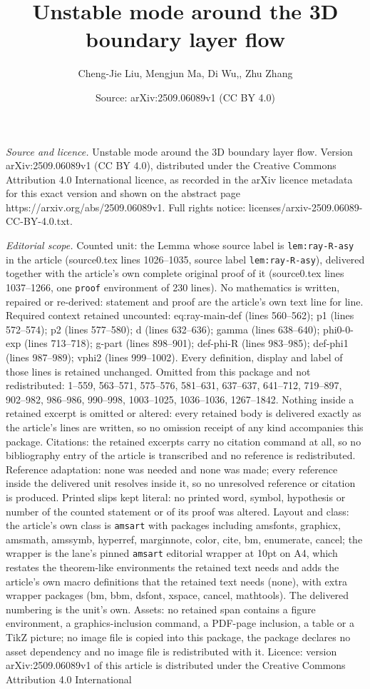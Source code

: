 \documentclass[10pt,a4paper]{amsart}
\title[Unstable mode around the 3D boundary layer flow]{Unstable mode around the 3D boundary layer flow}
\author{Cheng-Jie Liu, Mengjun Ma, Di Wu,, Zhu Zhang}
\date{Source: arXiv:2509.06089v1 (CC BY 4.0)}
\begin{document}
\maketitle

\noindent\emph{Source and licence.} Unstable mode around the 3D boundary layer flow. Version arXiv:2509.06089v1 (CC BY 4.0), distributed under the Creative Commons Attribution 4.0 International licence, as recorded in the arXiv licence metadata for this exact version and shown on the abstract page https://arxiv.org/abs/2509.06089v1. Full rights notice: licenses/arxiv-2509.06089-CC-BY-4.0.txt.\par\smallskip

\noindent\textit{Editorial scope.} Counted unit: the Lemma whose source label is \texttt{lem:ray-R-asy} in the article (source0.tex lines 1026--1035, source label \texttt{lem:ray-R-asy}), delivered together with the article's own complete original proof of it (source0.tex lines 1037--1266, one \texttt{proof} environment of 230 lines). No mathematics is written, repaired or re-derived: statement and proof are the article's own text line for line. Required context retained uncounted: eq:ray-main-def (lines 560--562); p1 (lines 572--574); p2 (lines 577--580); d (lines 632--636); gamma (lines 638--640); phi0-0-exp (lines 713--718); g-part (lines 898--901); def-phi-R (lines 983--985); def-phi1 (lines 987--989); vphi2 (lines 999--1002). Every definition, display and label of those lines is retained unchanged. Omitted from this package and not redistributed: 1--559, 563--571, 575--576, 581--631, 637--637, 641--712, 719--897, 902--982, 986--986, 990--998, 1003--1025, 1036--1036, 1267--1842. Nothing inside a retained excerpt is omitted or altered: every retained body is delivered exactly as the article's lines are written, so no omission receipt of any kind accompanies this package. Citations: the retained excerpts carry no citation command at all, so no bibliography entry of the article is transcribed and no reference is redistributed. Reference adaptation: none was needed and none was made; every reference inside the delivered unit resolves inside it, so no unresolved reference or citation is produced. Printed slips kept literal: no printed word, symbol, hypothesis or number of the counted statement or of its proof was altered. Layout and class: the article's own class is \texttt{amsart} with packages including amsfonts, graphicx, amsmath, amssymb, hyperref, marginnote, color, cite, bm, enumerate, cancel; the wrapper is the lane's pinned \texttt{amsart} editorial wrapper at 10pt on A4, which restates the theorem-like environments the retained text needs and adds the article's own macro definitions that the retained text needs (none), with extra wrapper packages (bm, bbm, dsfont, xspace, cancel, mathtools). The delivered numbering is the unit's own. Assets: no retained span contains a figure environment, a graphics-inclusion command, a PDF-page inclusion, a table or a TikZ picture; no image file is copied into this package, the package declares no asset dependency and no image file is redistributed with it. Licence: version arXiv:2509.06089v1 of this article is distributed under the Creative Commons Attribution 4.0 International 
\end{document}
